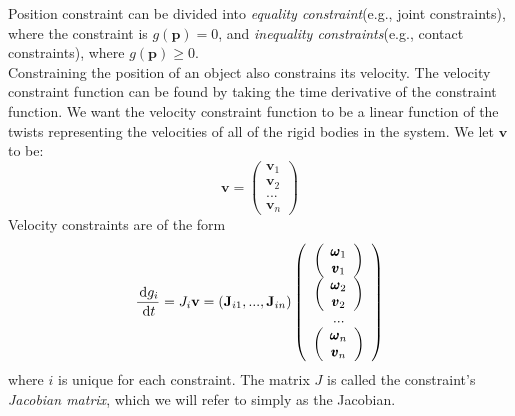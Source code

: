         Position constraint can be divided into \textit{equality constraint}(e.g., joint constraints), where the constraint is $g(\pmb{p}) = 0$, and \textit{inequality constraints}(e.g., contact constraints), where $g(\pmb{p}) \ge 0$. \\
        Constraining the position of an object also constrains its velocity. The velocity constraint function can be found by taking the time derivative of the constraint function. We want the velocity constraint function to be a linear function of the twists representing the velocities of all of the rigid bodies in the system. We let $\mathbf{v}$ to be:
        \begin{equation}
            \mathbf{v} = \left( \begin{array}{c}\mathbf{v}_1 \\\mathbf{v}_2 \\ ... \\ \mathbf{v}_n \end{array}\right)
        \end{equation}
        Velocity constraints are of the form
        \begin{equation}
            \frac{\,\mathrm{d} g_i}{\,\mathrm{d} t} = J_i \mathbf{v} = (\mathbf{J}_{i1} ,...,\mathbf{J}_{in} )\left(\begin{array}{c}\left(\begin{array}{c}\pmb{\omega}_1 \\ \pmb{v}_1\end{array}\right) \\ \left(\begin{array}{c}\pmb{\omega}_2 \\ \pmb{v}_2\end{array}\right) \\ ... \\ \left(\begin{array}{c}\pmb{\omega}_n \\ \pmb{v}_n\end{array}\right)\end{array}\right)
        \end{equation}
        where $i$ is unique for each constraint. The matrix $J$ is called the constraint's \textit{Jacobian matrix}, which we will refer to simply as the Jacobian. \\

